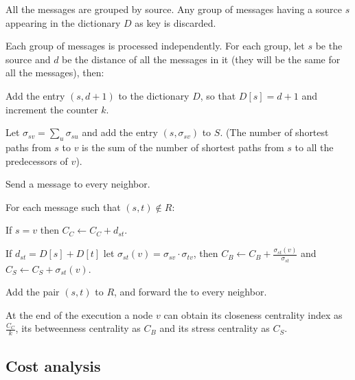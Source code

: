 \begin{algosteps}

  \item All the \mdisc{} messages are grouped by source. Any group of messages having a source $s$ appearing in the dictionary $D$ as key is discarded.

  \item Each group of messages is processed independently. For each group, let $s$ be the source and $d$ be the distance of all the  messages in it (they will be the same for all the messages), then:
  \begin{algosteps}
    \item Add the entry $(s,d+1)$ to the dictionary $D$, so that $D[s] = d+1$ and increment the counter $k$.
    \item Let $\sigma_{sv} = \sum_{u} \sigma_{su}$ and add the entry $(s,\sigma_{sv})$ to  $S$. (The number of shortest paths from $s$ to $v$ is the sum of the number of shortest paths from $s$ to all the predecessors of $v$).
    \item Send a  message to every neighbor.
  \end{algosteps}
  
  \item For each  message such that $(s,t) \notin R$:
  \begin{algosteps}
    \item If $s = v$ then $C_C \gets C_C + d_{st}$.
    \item If $d_{st} = D[s]+D[t]$ let $\sigma_{st}(v) = \sigma_{sv} \cdot \sigma_{tv}$, then $C_B \gets C_B + \frac{\sigma_{st}(v)}{\sigma_{st}}$ and $C_S \gets C_S + \sigma_{st}(v)$.
    \item Add the pair $(s,t)$ to $R$, and forward the \mrep{} to every neighbor. \label{step:deccen:report}
  \end{algosteps}
\end{algosteps}
At the end of the execution a node $v$ can obtain its closeness centrality index as $\frac{C_C}{k}$, its betweenness centrality as $C_B$ and its stress centrality as $C_S$.

\subsection{Cost analysis}


